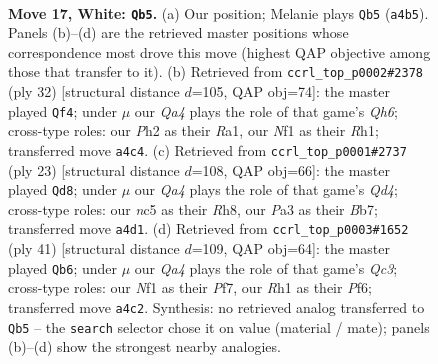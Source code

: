 \documentclass[11pt]{article}
\begin{document}
\clearpage

\begin{figure}[p]\centering
\begin{subfigure}{0.46\textwidth}\centering
\resizebox{\linewidth}{!}{%
\newchessgame
\chessboard[
  setfen={r1bq1k2/pp3pp1/2n1p3/2npP3/Q4P1r/P7/1P4PP/R3KNNR w KQ - 0 17},
  showmover=false,
  pgfstyle=straightmove, color=movearrow, markmove={a4-b5}
]}
\caption{}
\end{subfigure}\hfill
\begin{subfigure}{0.46\textwidth}\centering
\resizebox{\linewidth}{!}{%
\newchessgame
\chessboard[
  setfen={r1b1k2r/pp2q2p/2p2ppQ/2p2n2/P3P3/N2P3P/1PPN2P1/R3K2R w KQkq - 5 17},
  showmover=false,
  pgfstyle=straightmove, color=movearrow, markmove={h6-f4}
]}
\caption{}
\end{subfigure}
\\[4pt]
\begin{subfigure}{0.46\textwidth}\centering
\resizebox{\linewidth}{!}{%
\newchessgame
\chessboard[
  setfen={rn2k2r/pb3ppp/1pp1p3/3q4/Q2PP2R/P4N2/1P3PP1/R3KB2 b Qkq - 0 12},
  showmover=false,
  pgfstyle=straightmove, color=movearrow, markmove={d5-d8}
]}
\caption{}
\end{subfigure}\hfill
\begin{subfigure}{0.46\textwidth}\centering
\resizebox{\linewidth}{!}{%
\newchessgame
\chessboard[
  setfen={2k4r/p3bp1p/2q1ppn1/8/1p1N4/1B4P1/PPP1QP1P/2KR4 b - - 1 21},
  showmover=false,
  pgfstyle=straightmove, color=movearrow, markmove={c6-b6}
]}
\caption{}
\end{subfigure}
\caption{\textbf{Move 17, White: \texttt{Qb5}.} (a) Our position; Melanie plays \texttt{Qb5} (\texttt{a4b5}). Panels (b)--(d) are the retrieved master positions whose correspondence most drove this move (highest QAP objective among those that transfer to it). (b) Retrieved from \texttt{ccrl\_top\_p0002\#2378} (ply 32) [structural distance $d$=105, QAP obj=74]: the master played \texttt{Qf4}; under $\mu$ our \emph{Qa4} plays the role of that game's \emph{Qh6}; cross-type roles: our \emph{P}h2 as their \emph{R}a1, our \emph{N}f1 as their \emph{R}h1; transferred move \texttt{a4c4}. (c) Retrieved from \texttt{ccrl\_top\_p0001\#2737} (ply 23) [structural distance $d$=108, QAP obj=66]: the master played \texttt{Qd8}; under $\mu$ our \emph{Qa4} plays the role of that game's \emph{Qd4}; cross-type roles: our \emph{n}c5 as their \emph{R}h8, our \emph{P}a3 as their \emph{B}b7; transferred move \texttt{a4d1}. (d) Retrieved from \texttt{ccrl\_top\_p0003\#1652} (ply 41) [structural distance $d$=109, QAP obj=64]: the master played \texttt{Qb6}; under $\mu$ our \emph{Qa4} plays the role of that game's \emph{Qc3}; cross-type roles: our \emph{N}f1 as their \emph{P}f7, our \emph{R}h1 as their \emph{P}f6; transferred move \texttt{a4c2}. Synthesis: no retrieved analog transferred to \texttt{Qb5} -- the \texttt{search} selector chose it on value (material / mate); panels (b)--(d) show the strongest nearby analogies.}
\label{fig:thought-m32}
\end{figure}
\end{document}
